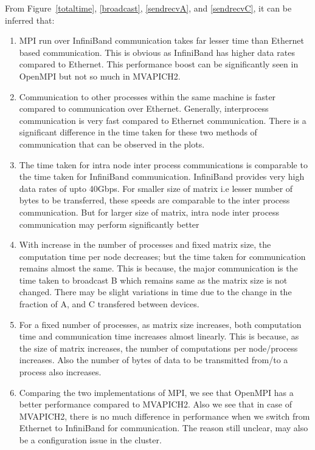 \documentclass[10pt]{article}
\begin{document}
From Figure~\ref{totaltime}, \ref{broadcast}, \ref{sendrecvA}, and \ref{sendrecvC}, it can be inferred that: 
\begin{enumerate}
\item MPI run over InfiniBand communication takes far lesser time than Ethernet based communication. This is obvious as InfiniBand has higher data rates compared to Ethernet. This performance boost can be significantly seen in OpenMPI but not so much in MVAPICH2.

\item Communication to other processes within the same machine is faster compared to communication over Ethernet. Generally, interprocess communication is very fast compared to Ethernet communication. There is a significant difference in the time taken for these two methods of communication that can be observed in the plots.
 
\item The time taken for intra node inter process communications is comparable to the time taken for InfiniBand communication. InfiniBand provides very high data rates of upto 40Gbps. For smaller size of matrix i.e lesser number of bytes to be transferred, these speeds are comparable to the inter process communication. But for larger size of matrix, intra node inter process communication may perform significantly better

\item With increase in the number of processes and fixed matrix size, the computation time per node decreases; but the time taken for communication remains almost the same. This is because, the major communication is the time taken to broadcast B which remains same as the matrix size is not changed. There may be slight variations in time due to the change in the fraction of A, and C transfered between devices.

\item For a fixed number of processes, as matrix size increases, both computation time and communication time increases almost linearly. This is because, as the size of matrix increases, the number of computations per node/process increases. Also the number of bytes of data to be transmitted from/to a process also increases.
 
\item Comparing the two implementations of MPI, we see that OpenMPI has a better performance compared to MVAPICH2. Also we see that in case of MVAPICH2, there is no much difference in performance when we switch from Ethernet to InfiniBand for communication. The reason still unclear, may also be a configuration issue in the cluster.
\end{enumerate}
\end{document}
